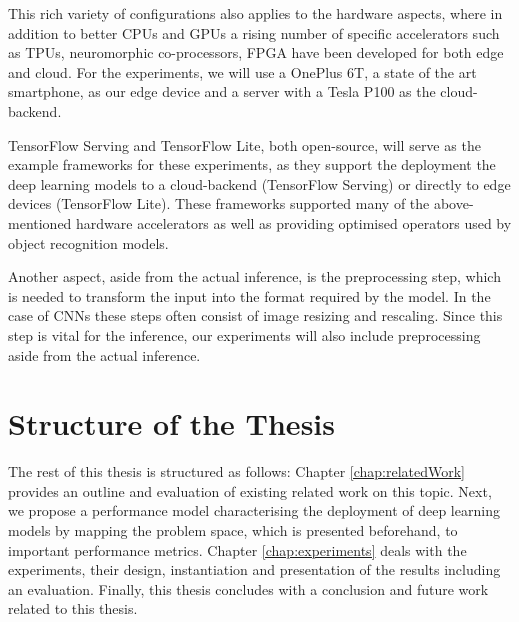 This rich variety of configurations also applies to the hardware aspects, where in addition to better CPUs and GPUs a rising number of specific accelerators such as TPUs, neuromorphic co-processors, FPGA have been developed for both edge and cloud.
For the experiments, we will use a OnePlus 6T, a state of the art smartphone, as our edge device and a server with a Tesla P100 as the cloud-backend.


TensorFlow Serving and TensorFlow Lite, both open-source, will serve as the example frameworks for these experiments, as they support the deployment the deep learning models to a cloud-backend (TensorFlow Serving) or directly to edge devices (TensorFlow Lite). These frameworks supported many of the above-mentioned hardware accelerators as well as providing optimised operators used by object recognition models.

Another aspect, aside from the actual inference, is the preprocessing step, which is needed to transform the input into the format required by the model. 
In the case of CNNs these steps often consist of image resizing and rescaling.
Since this step is vital for the inference, our experiments will also include preprocessing aside from the actual inference.

\section{Structure of the Thesis}
The rest of this thesis is structured as follows: Chapter \ref{chap:relatedWork} provides an outline and evaluation of existing related work on this topic. Next, we propose a performance model characterising the deployment of deep learning models by mapping the problem space, which is presented beforehand, to important performance metrics.
Chapter \ref{chap:experiments} deals with the experiments, their design, instantiation and presentation of the results including an evaluation.
Finally, this thesis concludes with a conclusion and future work related to this thesis.
